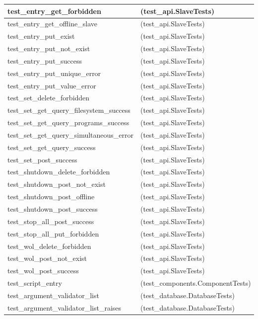 \begin{longtable}{|p{10cm}|p{7cm}|}
test\_entry\_get\_forbidden & (test\_api.SlaveTests)\\\hline
test\_entry\_get\_offline\_slave & (test\_api.SlaveTests)\\\hline
test\_entry\_put\_exist & (test\_api.SlaveTests)\\\hline
test\_entry\_put\_not\_exist & (test\_api.SlaveTests)\\\hline
test\_entry\_put\_success & (test\_api.SlaveTests)\\\hline
test\_entry\_put\_unique\_error & (test\_api.SlaveTests)\\\hline
test\_entry\_put\_value\_error & (test\_api.SlaveTests)\\\hline
test\_set\_delete\_forbidden & (test\_api.SlaveTests)\\\hline
test\_set\_get\_query\_filesystem\_success & (test\_api.SlaveTests)\\\hline
test\_set\_get\_query\_programs\_success & (test\_api.SlaveTests)\\\hline
test\_set\_get\_query\_simultaneous\_error & (test\_api.SlaveTests)\\\hline
test\_set\_get\_query\_success & (test\_api.SlaveTests)\\\hline
test\_set\_post\_success & (test\_api.SlaveTests)\\\hline
test\_shutdown\_delete\_forbidden & (test\_api.SlaveTests)\\\hline
test\_shutdown\_post\_not\_exist & (test\_api.SlaveTests)\\\hline
test\_shutdown\_post\_offline & (test\_api.SlaveTests)\\\hline
test\_shutdown\_post\_success & (test\_api.SlaveTests)\\\hline
test\_stop\_all\_post\_success & (test\_api.SlaveTests)\\\hline
test\_stop\_all\_put\_forbidden & (test\_api.SlaveTests)\\\hline
test\_wol\_delete\_forbidden & (test\_api.SlaveTests)\\\hline
test\_wol\_post\_not\_exist & (test\_api.SlaveTests)\\\hline
test\_wol\_post\_success & (test\_api.SlaveTests)\\\hline
test\_script\_entry & (test\_components.ComponentTests)\\\hline
test\_argument\_validator\_list & (test\_database.DatabaseTests)\\\hline
test\_argument\_validator\_list\_raises & (test\_database.DatabaseTests)\\\hline

\end{longtable}
